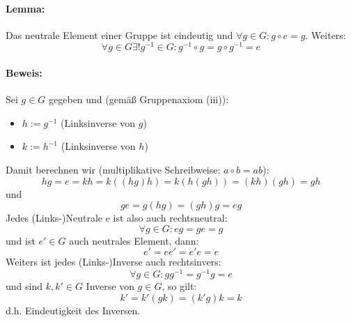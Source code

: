 \documentclass[12pt,a4paper,parskip=half-,DIV=15]{scrartcl}
\begin{document}
\paragraph{Lemma:} Das neutrale Element einer Gruppe ist eindeutig und $\forall g\in G: g\circ e = g$. Weiters: \begin{equation*}\forall g\in G \exists ! g^{-1} \in G: g^{-1}\circ g = g \circ g^{-1} = e\end{equation*}

\paragraph{Beweis:} Sei $g\in G$ gegeben und (gemäß Gruppenaxiom (iii)):
\begin{itemize}
\item $h:= g^{-1}$ (Linksinverse von $g$)
\item $k:= h^{-1}$ (Linksinverse von $h$)
\end{itemize}
Damit berechnen wir (multiplikative Schreibweise: $a\circ b = ab$):
\begin{equation*}
hg = e = kh = k((hg)h) = k(h(gh)) = (kh)(gh) = gh
\end{equation*}
und
\begin{equation*}
ge = g(hg) = (gh)g = eg
\end{equation*}
Jedes (Links-)Neutrale e ist also auch rechtsneutral:
\begin{equation*}
\forall g\in G: eg = ge = g
\end{equation*}
und ist $e'\in G$ auch neutrales Element, dann:
\begin{equation*}
e' = ee' = e'e = e
\end{equation*}
Weiters ist jedes (Links-)Inverse auch rechtsinvers:
\begin{equation*}
\forall g \in G: gg^{-1}=g^{-1}g = e
\end{equation*}
und sind $k,k'\in G$ Inverse von $g\in G$, so gilt:
\begin{equation*}
k' = k'(gk) = (k'g)k = k
\end{equation*}
d.h. Eindeutigkeit des Inversen.
\end{document}

